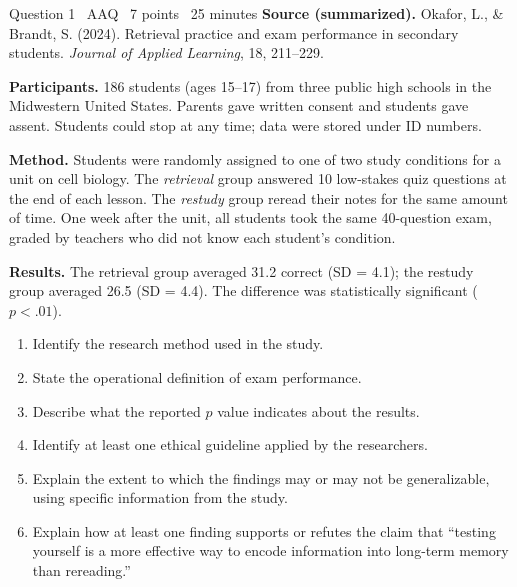 \documentclass[11pt]{article}
\begin{document}
\begin{frq}{Question 1 \textperiodcentered\ AAQ \textperiodcentered\ 7 points \textperiodcentered\ 25 minutes}
\small
\textbf{Source (summarized).} Okafor, L., \& Brandt, S. (2024). Retrieval practice and exam performance in secondary students. \emph{Journal of Applied Learning}, 18, 211--229.

\textbf{Participants.} 186 students (ages 15--17) from three public high schools in the Midwestern United States. Parents gave written consent and students gave assent. Students could stop at any time; data were stored under ID numbers.

\textbf{Method.} Students were randomly assigned to one of two study conditions for a unit on cell biology. The \emph{retrieval} group answered 10 low-stakes quiz questions at the end of each lesson. The \emph{restudy} group reread their notes for the same amount of time. One week after the unit, all students took the same 40-question exam, graded by teachers who did not know each student's condition.

\textbf{Results.} The retrieval group averaged 31.2 correct (SD = 4.1); the restudy group averaged 26.5 (SD = 4.4). The difference was statistically significant (\(p < .01\)).

\medskip
\begin{enumerate}[label=(\Alph*),leftmargin=2em,itemsep=3pt]
\item Identify the research method used in the study.
\item State the operational definition of exam performance.
\item Describe what the reported \(p\) value indicates about the results.
\item Identify at least one ethical guideline applied by the researchers.
\item Explain the extent to which the findings may or may not be generalizable, using specific information from the study.
\item Explain how at least one finding supports or refutes the claim that ``testing yourself is a more effective way to encode information into long-term memory than rereading.''
\end{enumerate}
\end{frq}

\makekey
\end{document}
